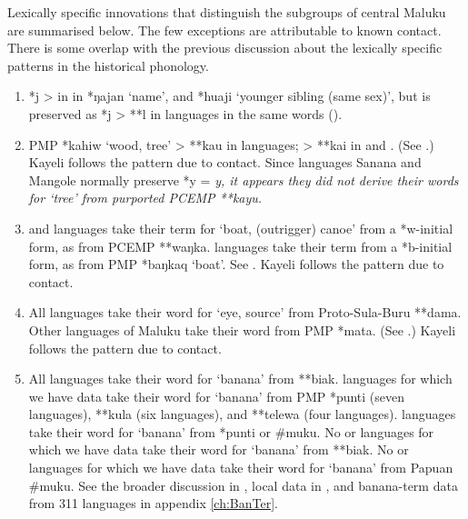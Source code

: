 \clearpage
{}
Lexically specific innovations that distinguish the subgroups
of central Maluku are summarised below.
The few exceptions are attributable to known contact.
There is some overlap with the previous discussion about the
lexically specific patterns in the historical phonology.

\begin{enumerate}
	\item	*j > {\0} in  in *ŋajan ‘name’,
				and *huaji ‘younger sibling (same sex)’,
				but is preserved as *j > **l in  languages in
				the same words ().
	\item	PMP *kahiw ‘wood,
				tree’ > **kau in  languages; > **kai in  and .
				(See .) Kayeli follows the  pattern due to contact.
				Since  languages Sanana
				and Mangole normally preserve *y = \it{y},
				it appears they did not derive their words for
				‘tree’ from purported PCEMP **kayu.
	\item	{}
				and  languages take their term for
				‘boat, (outrigger) canoe’ from a *w-initial form,
				as from PCEMP **waŋka.
				 languages take their term from a *b-initial
				form, as from PMP *baŋkaq ‘boat’.
				See .
				Kayeli follows the  pattern due to contact.
	\item	All  languages take their word for ‘eye,
				source’ from Proto-Sula-Buru **dama.
				Other  languages of Maluku take their word from PMP *mata. (See .)
				Kayeli follows the  pattern due to contact.
	\item	All  languages take their word for ‘banana’ from **biak.
				 languages for which we have data take their
				word for ‘banana’ from PMP *punti (seven languages),
				**kula (six languages), and **telewa (four languages).
				 languages take their word for ‘banana’
				from *punti or {\#}muku.
				No  or  languages
				for which we have data take their word for ‘banana’ from **biak.
				No  or  languages for which we
				have data take their word for ‘banana’ from Papuan {\#}muku.
				See the broader discussion in ,
				local data in ,
				and banana-term data from 311 languages in appendix \ref{ch:BanTer}.

\end{enumerate}
